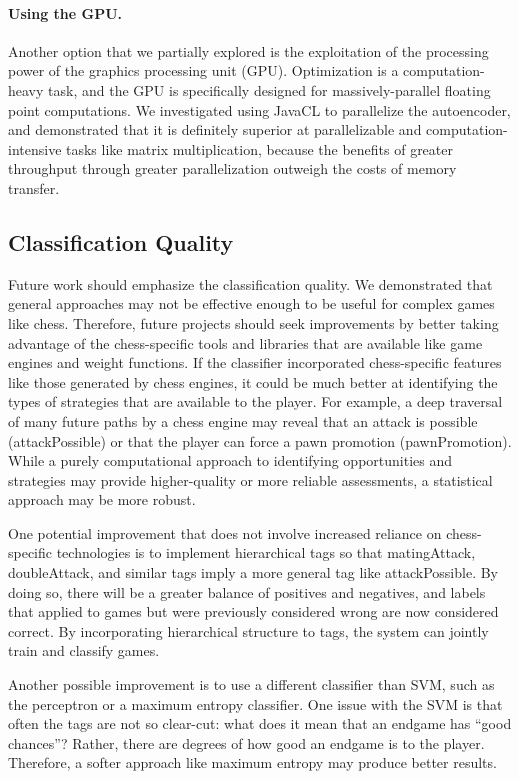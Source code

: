 \documentclass[11pt]{article}
\begin{document}
\paragraph{Using the GPU.}
Another option that we partially explored is the exploitation of the processing power of the graphics processing unit (GPU). Optimization is a computation-heavy task, and the GPU is specifically designed for massively-parallel floating point computations. We investigated using JavaCL to parallelize the autoencoder, and demonstrated that it is definitely superior at parallelizable and computation-intensive tasks like matrix multiplication, because the benefits of greater throughput through greater parallelization outweigh the costs of memory transfer.

\subsection{Classification Quality}
Future work should emphasize the classification quality. We demonstrated that general approaches may not be effective enough to be useful for complex games like chess. Therefore, future projects should seek improvements by better taking advantage of the chess-specific tools and libraries that are available like game engines and weight functions. If the classifier incorporated chess-specific features like those generated by chess engines, it could be much better at identifying the types of strategies that are available to the player. For example, a deep traversal of many future paths by a chess engine may reveal that an attack is possible (attackPossible) or that the player can force a pawn promotion (pawnPromotion). While a purely computational approach to identifying opportunities and strategies may provide higher-quality or more reliable assessments, a statistical approach may be more robust. %

One potential improvement that does not involve increased reliance on chess-specific technologies is to implement hierarchical tags so that matingAttack, doubleAttack, and similar tags imply a more general tag like attackPossible. By doing so, there will be a greater balance of positives and negatives, and labels that applied to games but were previously considered wrong are now considered correct. By incorporating hierarchical structure to tags, the system can jointly train and classify games.

Another possible improvement is to use a different classifier than SVM, such as the perceptron or a maximum entropy classifier. One issue with the SVM is that often the tags are not so clear-cut: what does it mean that an endgame has “good chances”? Rather, there are degrees of how good an endgame is to the player. Therefore, a softer approach like maximum entropy may produce better results.
\end{document}
